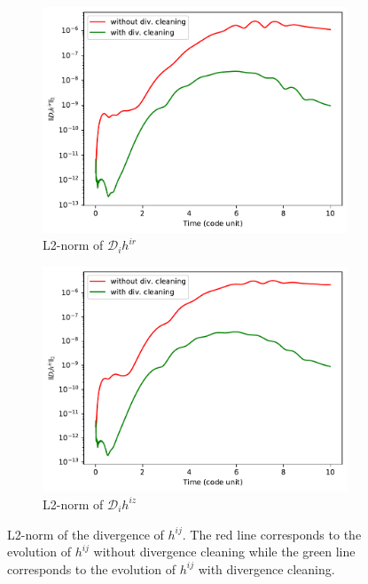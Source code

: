 \begin{figure}[h!]
\centering
\begin{subfigure}{.5\textwidth}
  \centering
  \includegraphics[width=\linewidth]{Dh1.pdf}
  \caption{L2-norm of $\mathcal{D}_i h^{ir}$}
  \label{fig:Dh1}
\end{subfigure}%
\begin{subfigure}{.5\textwidth}
  \centering
  \includegraphics[width=\linewidth]{Dh2.pdf}
  \caption{L2-norm of $\mathcal{D}_i h^{iz}$}
  \label{fig:Dh2}
\end{subfigure}
\caption{L2-norm of the divergence of $h^{ij}$.
The red line corresponds to the evolution of $h^{ij}$ without divergence cleaning
while the green line corresponds to the evolution of $h^{ij}$ with divergence cleaning.}
\label{fig:Dh}
\end{figure}
